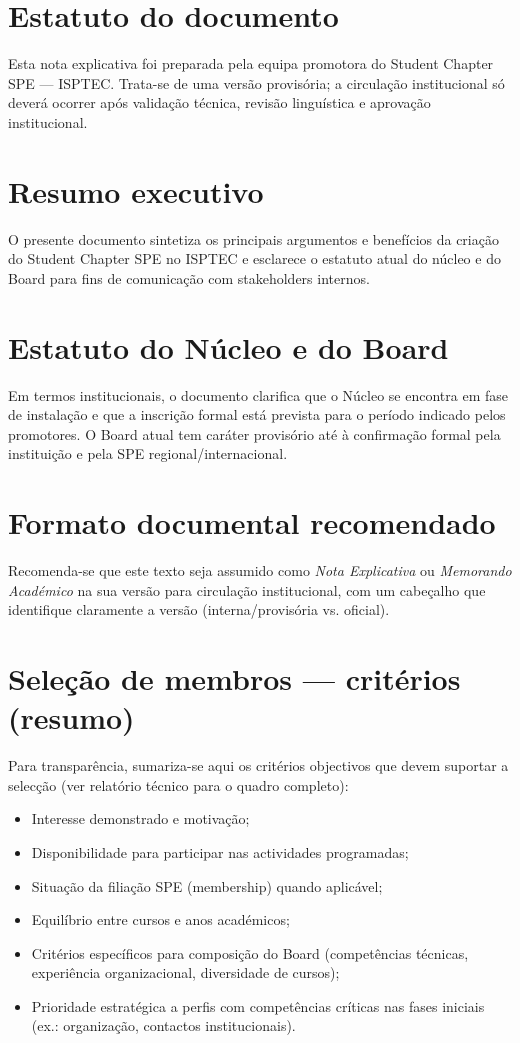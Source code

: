 \documentclass[11pt,a4paper]{article}
\author{}
\date{Março de 2026 — Versão provisória}
\begin{document}
\maketitle

\section*{Estatuto do documento}
Esta nota explicativa foi preparada pela equipa promotora do Student Chapter SPE — ISPTEC. Trata-se de uma versão provisória; a circulação institucional só deverá ocorrer após validação técnica, revisão linguística e aprovação institucional.

\section{Resumo executivo}
O presente documento sintetiza os principais argumentos e benefícios da criação do Student Chapter SPE no ISPTEC e esclarece o estatuto atual do núcleo e do Board para fins de comunicação com stakeholders internos.

\section{Estatuto do Núcleo e do Board}
Em termos institucionais, o documento clarifica que o Núcleo se encontra em fase de instalação e que a inscrição formal está prevista para o período indicado pelos promotores. O Board atual tem caráter provisório até à confirmação formal pela instituição e pela SPE regional/internacional.

\section{Formato documental recomendado}
Recomenda-se que este texto seja assumido como \emph{Nota Explicativa} ou \emph{Memorando Académico} na sua versão para circulação institucional, com um cabeçalho que identifique claramente a versão (interna/provisória vs. oficial).

\section{Seleção de membros — critérios (resumo)}
Para transparência, sumariza-se aqui os critérios objectivos que devem suportar a selecção (ver relatório técnico para o quadro completo):
\begin{itemize}[leftmargin=1.0cm]
  \item Interesse demonstrado e motivação;
  \item Disponibilidade para participar nas actividades programadas;
  \item Situação da filiação SPE (membership) quando aplicável;
  \item Equilíbrio entre cursos e anos académicos;
  \item Critérios específicos para composição do Board (competências técnicas, experiência organizacional, diversidade de cursos);
  \item Prioridade estratégica a perfis com competências críticas nas fases iniciais (ex.: organização, contactos institucionais).
\end{itemize}
\end{document}

